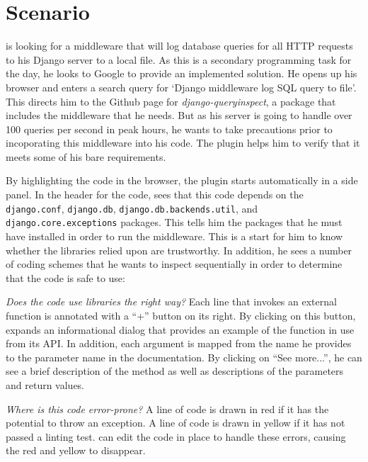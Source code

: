 \section{Scenario}

\user{} is looking for a middleware that will log database queries for all HTTP requests to his Django server to a local file.
As this is a secondary programming task for the day, he looks to Google to provide an implemented solution.
He opens up his browser and enters a search query for `Django middleware log SQL query to file'.
This directs him to the Github page for \emph{django-queryinspect}, a package that includes the middleware that he needs.
But as his server is going to handle over 100 queries per second in peak hours, he wants to take precautions prior to incoporating this middleware into his code.
The \systemname{} plugin helps him to verify that it meets some of his bare requirements.

By highlighting the code in the browser, the \systemname{} plugin starts automatically in a side panel.
In the header for the code, \user{} sees that this code depends on the \texttt{django.conf}, \texttt{django.db}, \texttt{django.db.backends.util}, and \texttt{django.core.exceptions} packages.
This tells him the packages that he must have installed in order to run the middleware.
This is a start for him to know whether the libraries relied upon are trustworthy.
In addition, he sees a number of coding schemes that he wants to inspect sequentially in order to determine that the code is safe to use:

\emph{Does the code use libraries the right way?}
Each line that invokes an external function is annotated with a ``+'' button on its right.
By clicking on this button, \user{} expands an informational dialog that provides an example of the function in use from its API.
In addition, each argument is mapped from the name he provides to the parameter name in the documentation.
By clicking on ``See more...'', he can see a brief description of the method as well as descriptions of the parameters and return values.

\emph{Where is this code error-prone?}
A line of code is drawn in red if it has the potential to throw an exception.
A line of code is drawn in yellow if it has not passed a linting test.
\user{} can edit the code in place to handle these errors, causing the red and yellow to disappear.

